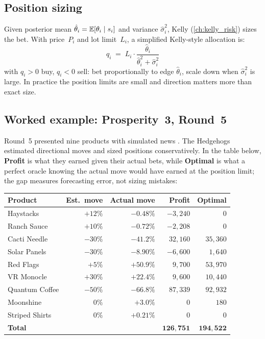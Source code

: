 \subsection{Position sizing}

Given posterior mean $\hat{\theta}_i = \mathbb{E}[\theta_i \mid s_i]$
and variance $\hat{\sigma}_i^2$, Kelly (\cref{ch:kelly_risk})
sizes the bet.  With price~$P_i$ and lot limit~$L_i$, a
simplified Kelly-style allocation is:
\begin{equation}
  q_i
  \;=\;
  L_i \cdot \frac{\hat{\theta}_i}
  {\hat{\theta}_i^2 + \hat{\sigma}_i^2}
  \label{eq:ch25_kelly_news}
\end{equation}
with $q_i > 0$ buy, $q_i < 0$ sell: bet proportionally to edge
$\hat{\theta}_i$, scale down when $\hat{\sigma}_i^2$ is large.
In practice the position limits are small and direction matters
more than exact size.

\subsection{Worked example: Prosperity~3, Round~5}

Round~5 presented nine products with simulated news
\citep{frankfurtHedgehogs2025imcP3}.  The Hedgehogs estimated
directional moves and sized positions conservatively.  In the
table below, \textbf{Profit} is what they earned given their
actual bets, while \textbf{Optimal} is what a perfect oracle
knowing the actual move would have earned at the position
limit; the gap measures forecasting error, not sizing mistakes:

\medskip
\begin{center}
\small
\begin{tabular}{l r r r r}
\toprule
\textbf{Product} & \textbf{Est.\ move} & \textbf{Actual move} &
\textbf{Profit} & \textbf{Optimal} \\
\midrule
Haystacks       & $+12\%$ & $-0.48\%$ & $-3{,}240$  & $0$ \\
Ranch Sauce     & $+10\%$ & $-0.72\%$ & $-2{,}208$  & $0$ \\
Cacti Needle    & $-30\%$ & $-41.2\%$ & $32{,}160$  & $35{,}360$ \\
Solar Panels    & $-30\%$ & $-8.90\%$ & $-6{,}600$  & $1{,}640$ \\
Red Flags       & $+5\%$  & $+50.9\%$ & $9{,}700$   & $53{,}970$ \\
VR Monocle      & $+30\%$ & $+22.4\%$ & $9{,}600$   & $10{,}440$ \\
Quantum Coffee  & $-50\%$ & $-66.8\%$ & $87{,}339$  & $92{,}932$ \\
Moonshine       & $0\%$   & $+3.0\%$  & $0$         & $180$ \\
Striped Shirts  & $0\%$   & $+0.21\%$ & $0$         & $0$ \\
\midrule
\textbf{Total}  &         &           & $\mathbf{126{,}751}$ & $\mathbf{194{,}522}$ \\
\bottomrule
\end{tabular}
\end{center}
\medskip

